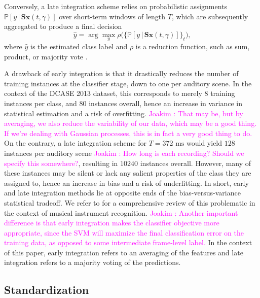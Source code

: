 \documentclass[journal]{IEEEtran}
\newcommand{\ja}[1]{\textcolor{magenta}{Joakim : #1}}
\begin{document}
Conversely, a late integration scheme relies on probabilistic assignments $\mathbb{P}\left[y \,\vert\, \mathbf{S}\boldsymbol{x}(t,\gamma) \right]$ over short-term windows of length $T$, which are subsequently aggregated to produce a final decision
\begin{equation}
\hat{y} = \arg \max_{y} \rho\Big(\big\{ \mathbb{P}\left[y \,\vert\, \mathbf{S}\boldsymbol{x}(t,\gamma) \right] \big\}_{t} \Big)\mbox{,}
\end{equation}
where $\hat{y}$ is the estimated class label and $\rho$ is a reduction function, such as sum, product, or majority vote \cite{Kittler1998}.

A drawback of early integration is that it drastically reduces the number of training instances at the classifier stage, down to one per auditory scene.
In the context of the DCASE 2013 dataset, this corresponds to merely $8$ training instances per class, and $80$ instances overall, hence an increase in variance in statistical estimation and a risk of overfitting. \ja{That may be, but by averaging, we also reduce the variability of our data, which may be a good thing. If we're dealing with Gaussian processes, this is in fact a very good thing to do.}
On the contrary, a late integration scheme for $T=372\textrm{ ms}$ would yield $128$ instances per auditory scene \ja{How long is each recording? Should we specify this somewhere?}, resulting in $10240$ instances overall.
However, many of these instances may be silent or lack any salient properties of the class they are assigned to, hence an increase in bias and a risk of underfitting.
In short, early and late integration methods lie at opposite ends of the bias-versus-variance statistical tradeoff. We refer to \cite{Joder2009} for a comprehensive review of this problematic in the context of musical instrument recognition. \ja{Another important difference is that early integration makes the classifier objective more appropriate, since the SVM will maximize the final classification error on the training data, as opposed to some intermediate frame-level label.}
In the context of this paper, early integration refers to an averaging of the features and late integration refers to a majority voting of the predictions. 
\subsection{Standardization}
\label{sec:stand}
\end{document}
